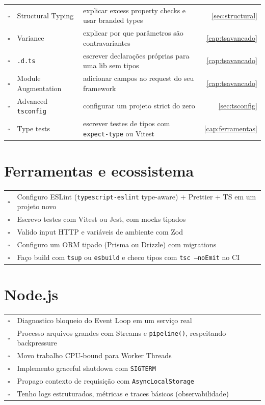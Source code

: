 \documentclass[12pt,a4paper,oneside]{book}
\newcommand{\code}[1]{\texttt{#1}}
\newcommand{\cb}{$\square$}
\begin{document}
{\begin{tabularx}{\textwidth}{@{}clXr@{}}
\cb & Structural Typing & explicar excess property checks e usar branded types & \ref{sec:structural} \\
\cb & Variance & explicar por que parâmetros são contravariantes & \ref{cap:tsavancado} \\
\cb & \code{.d.ts} & escrever declarações próprias para uma lib sem tipos & \ref{cap:tsavancado} \\
\cb & Module Augmentation & adicionar campos ao request do seu framework & \ref{cap:tsavancado} \\
\cb & Advanced \code{tsconfig} & configurar um projeto strict do zero & \ref{sec:tsconfig} \\
\cb & Type tests & escrever testes de tipos com \code{expect-type} ou Vitest & \ref{cap:ferramentas} \\
\bottomrule
\end{tabularx}
}

\section{Ferramentas e ecossistema}

{\small
\begin{tabularx}{\textwidth}{@{}cX@{}}
\toprule
\cb & Configuro ESLint (\code{typescript-eslint} type-aware) + Prettier + TS em um projeto novo \\
\cb & Escrevo testes com Vitest ou Jest, com mocks tipados \\
\cb & Valido input HTTP e variáveis de ambiente com Zod \\
\cb & Configuro um ORM tipado (Prisma ou Drizzle) com migrations \\
\cb & Faço build com \code{tsup} ou \code{esbuild} e checo tipos com \code{tsc --noEmit} no CI \\
\bottomrule
\end{tabularx}
}

\section{Node.js}

{\small
\begin{tabularx}{\textwidth}{@{}cX@{}}
\toprule
\cb & Diagnostico bloqueio do Event Loop em um serviço real \\
\cb & Processo arquivos grandes com Streams e \code{pipeline()}, respeitando backpressure \\
\cb & Movo trabalho CPU-bound para Worker Threads \\
\cb & Implemento graceful shutdown com \code{SIGTERM} \\
\cb & Propago contexto de requisição com \code{AsyncLocalStorage} \\
\cb & Tenho logs estruturados, métricas e traces básicos (observabilidade) \\
\bottomrule
\end{tabularx}
}
\end{document}
